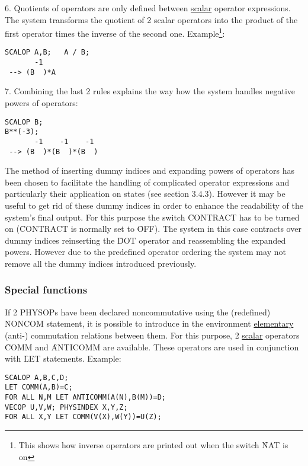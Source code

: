 6. Quotients of operators are only defined between
\underline{scalar} operator expressions.
The system transforms the quotient of 2 scalar operators into the
product of the first operator times the inverse of the second one.
Example\footnote{This shows how inverse operators are printed out when
the switch \f{NAT} is on}: 

\begin{verbatim}
SCALOP A,B;   A / B;
       -1
 --> (B  )*A
\end{verbatim}

7. Combining the  last 2 rules explains the way how the system
handles negative powers of operators: 

\noindent
\begin{verbatim}
SCALOP B;
B**(-3);
       -1    -1    -1
 --> (B  )*(B  )*(B  )
\end{verbatim}


The method of inserting dummy indices and expanding powers of
operators has been chosen to facilitate the handling of
complicated operator
expressions and particularly their application  on states
(see section 3.4.3). However it may be useful to get rid of these
dummy indices in order to enhance the readability of the
system's final output.
For this purpose the switch \f{CONTRACT}  has to
be turned on (\f{CONTRACT} is normally set to \f{OFF}).
The system in this case contracts over dummy indices reinserting the
\f{DOT} operator and reassembling the expanded powers.  However due to
the predefined operator ordering the system may not remove all the
dummy indices introduced previously.

\subsubsection{Special functions}


If 2 PHYSOPs have been declared noncommutative using the (redefined)
\f{NONCOM} statement, it is possible to introduce in the environment
\underline{elementary} (anti-) commutation relations between them. For
this purpose,
2 \underline{scalar} operators \f{COMM}  and
\f{ANTICOMM}  are available.
These operators are used in conjunction with \f{LET} statements.
Example: 

\begin{verbatim}
SCALOP A,B,C,D;
LET COMM(A,B)=C;
FOR ALL N,M LET ANTICOMM(A(N),B(M))=D;
VECOP U,V,W; PHYSINDEX X,Y,Z;
FOR ALL X,Y LET COMM(V(X),W(Y))=U(Z);
\end{verbatim}

